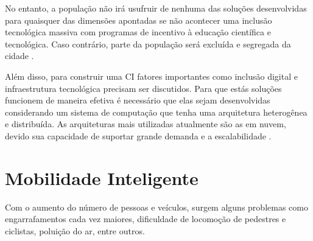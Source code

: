 No entanto, a população não irá usufruir de nenhuma das soluções desenvolvidas para quaisquer das dimensões apontadas se não acontecer uma inclusão tecnológica massiva com programas de incentivo à educação científica e tecnológica. Caso contrário, parte da população será excluída e segregada da cidade \cite{patricia}.

Além disso, para construir uma CI fatores importantes como inclusão digital e infraestrutura tecnológica precisam ser discutidos. Para que estás soluções funcionem de maneira efetiva é necessário que elas sejam desenvolvidas considerando um sistema de computação que tenha uma arquitetura heterogênea e distribuída. As arquiteturas mais utilizadas atualmente são as em nuvem, devido sua capacidade de suportar grande demanda e a escalabilidade \cite{patricia}. 

\section{Mobilidade Inteligente}

Com o aumento do número de pessoas e veículos, surgem alguns problemas  como engarrafamentos cada vez maiores, dificuldade de locomoção de pedestres e ciclistas, poluição do ar, entre outros. 

